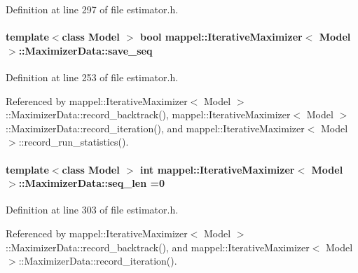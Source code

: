 Definition at line 297 of file estimator.\+h.

\paragraph[{\texorpdfstring{save\+\_\+seq}{save_seq}}]{\setlength{\rightskip}{0pt plus 5cm}template$<$class Model $>$ bool {\bf mappel\+::\+Iterative\+Maximizer}$<$ Model $>$\+::Maximizer\+Data\+::save\+\_\+seq}\hypertarget{classmappel_1_1IterativeMaximizer_1_1MaximizerData_af13babebeb16147883db7af0b4875b53}{}\label{classmappel_1_1IterativeMaximizer_1_1MaximizerData_af13babebeb16147883db7af0b4875b53}


Definition at line 253 of file estimator.\+h.



Referenced by mappel\+::\+Iterative\+Maximizer$<$ Model $>$\+::\+Maximizer\+Data\+::record\+\_\+backtrack(), mappel\+::\+Iterative\+Maximizer$<$ Model $>$\+::\+Maximizer\+Data\+::record\+\_\+iteration(), and mappel\+::\+Iterative\+Maximizer$<$ Model $>$\+::record\+\_\+run\+\_\+statistics().

\paragraph[{\texorpdfstring{seq\+\_\+len}{seq_len}}]{\setlength{\rightskip}{0pt plus 5cm}template$<$class Model $>$ int {\bf mappel\+::\+Iterative\+Maximizer}$<$ Model $>$\+::Maximizer\+Data\+::seq\+\_\+len =0\hspace{0.3cm}{\ttfamily [protected]}}\hypertarget{classmappel_1_1IterativeMaximizer_1_1MaximizerData_a78a56d5ffe0cad0de474e244816748a6}{}\label{classmappel_1_1IterativeMaximizer_1_1MaximizerData_a78a56d5ffe0cad0de474e244816748a6}


Definition at line 303 of file estimator.\+h.



Referenced by mappel\+::\+Iterative\+Maximizer$<$ Model $>$\+::\+Maximizer\+Data\+::record\+\_\+backtrack(), and mappel\+::\+Iterative\+Maximizer$<$ Model $>$\+::\+Maximizer\+Data\+::record\+\_\+iteration().

